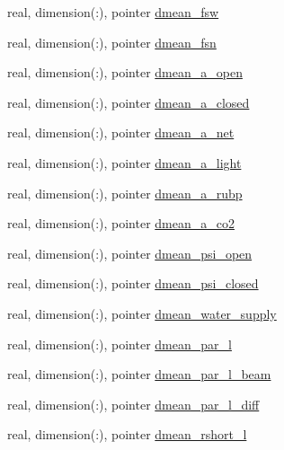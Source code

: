 \begin{DoxyCompactItemize}
\item 
real, dimension(\+:), pointer \hyperlink{structed__state__vars_1_1edtype_a68a8452c9597a8ef58ff89b54f73094e}{dmean\+\_\+fsw}
\item 
real, dimension(\+:), pointer \hyperlink{structed__state__vars_1_1edtype_a17c3c3c2b7d2d51b010a817cfe00b74a}{dmean\+\_\+fsn}
\item 
real, dimension(\+:), pointer \hyperlink{structed__state__vars_1_1edtype_a84c75c72dc28509edf8695fc1f791eea}{dmean\+\_\+a\+\_\+open}
\item 
real, dimension(\+:), pointer \hyperlink{structed__state__vars_1_1edtype_a1fa3c391f21f55711c2262336ec0788b}{dmean\+\_\+a\+\_\+closed}
\item 
real, dimension(\+:), pointer \hyperlink{structed__state__vars_1_1edtype_aa2b1bbc82600b839ebd0f5ea9d7455f1}{dmean\+\_\+a\+\_\+net}
\item 
real, dimension(\+:), pointer \hyperlink{structed__state__vars_1_1edtype_a3047e73b6cffffc7552f3fe54baa8522}{dmean\+\_\+a\+\_\+light}
\item 
real, dimension(\+:), pointer \hyperlink{structed__state__vars_1_1edtype_a56bc9422a5fbb18eb8336a078e911cf9}{dmean\+\_\+a\+\_\+rubp}
\item 
real, dimension(\+:), pointer \hyperlink{structed__state__vars_1_1edtype_ab926319a26f6cea31761b724b05ad965}{dmean\+\_\+a\+\_\+co2}
\item 
real, dimension(\+:), pointer \hyperlink{structed__state__vars_1_1edtype_ab6062999b2fc3edcfd73cad97a14903b}{dmean\+\_\+psi\+\_\+open}
\item 
real, dimension(\+:), pointer \hyperlink{structed__state__vars_1_1edtype_ab40dd8e8d79e0ce8f3331bba377595d6}{dmean\+\_\+psi\+\_\+closed}
\item 
real, dimension(\+:), pointer \hyperlink{structed__state__vars_1_1edtype_a38c121c7d5067eaa9f7d01011c91fc79}{dmean\+\_\+water\+\_\+supply}
\item 
real, dimension(\+:), pointer \hyperlink{structed__state__vars_1_1edtype_ae508d46527cd32a7659faf27e3e491b1}{dmean\+\_\+par\+\_\+l}
\item 
real, dimension(\+:), pointer \hyperlink{structed__state__vars_1_1edtype_a1bcdaddaa14c0f4bbbe1918345d1b8bb}{dmean\+\_\+par\+\_\+l\+\_\+beam}
\item 
real, dimension(\+:), pointer \hyperlink{structed__state__vars_1_1edtype_a214c61dfac28629b8b22a2af7a40bbaf}{dmean\+\_\+par\+\_\+l\+\_\+diff}
\item 
real, dimension(\+:), pointer \hyperlink{structed__state__vars_1_1edtype_a80aa9a805d9c1b3cbc4036441b363c43}{dmean\+\_\+rshort\+\_\+l}

\end{DoxyCompactItemize}
